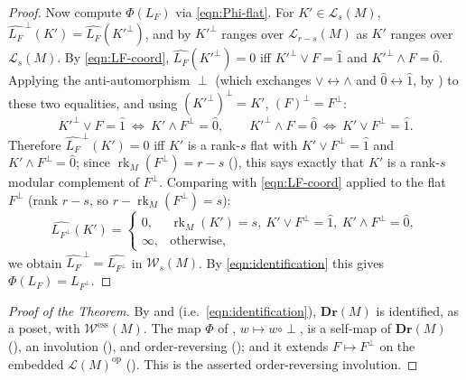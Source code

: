 \documentclass{article}
\theoremstyle{definition}
\newcommand{\rk}{\operatorname{rk}}
\newcommand{\op}{\operatorname{op}}
\newcommand{\Dr}{\mathbf{Dr}}
\newcommand{\cLL}{\mathcal{L}}
\newcommand{\cW}{\mathcal{W}}
\begin{document}
\begin{proof}
Now compute $\Phi(L_F)$ via \eqref{eqn:Phi-flat}. For $K'\in\cLL_{s}(M)$,
$\widehat{L_F}^{\,\perp}(K')=\widehat{L_F}(K'^{\perp})$, and by  $K'^{\perp}$ ranges
over $\cLL_{r-s}(M)$ as $K'$ ranges over $\cLL_{s}(M)$. By \eqref{eqn:LF-coord},
$\widehat{L_F}(K'^{\perp})=0$ iff $K'^{\perp}\vee F=\hat1$ and $K'^{\perp}\wedge F=\hat0$. Applying
the anti-automorphism $\perp$ (which exchanges $\vee\leftrightarrow\wedge$ and
$\hat0\leftrightarrow\hat1$, by ) to these two equalities, and using
$(K'^{\perp})^{\perp}=K'$, $(F)^{\perp}=F^{\perp}$:
\[
  K'^{\perp}\vee F=\hat1\ \Longleftrightarrow\ K'\wedge F^{\perp}=\hat0,\qquad
  K'^{\perp}\wedge F=\hat0\ \Longleftrightarrow\ K'\vee F^{\perp}=\hat1 .
\]
Therefore $\widehat{L_F}^{\,\perp}(K')=0$ iff $K'$ is a rank-$s$ flat with $K'\vee F^{\perp}=\hat1$
and $K'\wedge F^{\perp}=\hat0$; since $\rk_M(F^{\perp})=r-s$ (), this says exactly
that $K'$ is a rank-$s$ modular complement of $F^{\perp}$. Comparing with \eqref{eqn:LF-coord}
applied to the flat $F^{\perp}$ (rank $r-s$, so $r-\rk_M(F^{\perp})=s$):
\[
  \widehat{L_{F^{\perp}}}(K')=\begin{cases}0,&\rk_M(K')=s,\ K'\vee F^{\perp}=\hat1,\ K'\wedge
  F^{\perp}=\hat0,\\ \infty,&\text{otherwise,}\end{cases}
\]
we obtain $\widehat{L_F}^{\,\perp}=\widehat{L_{F^{\perp}}}$ in $\cW_{s}(M)$. By
\eqref{eqn:identification} this gives $\Phi(L_F)=L_{F^{\perp}}$.
\end{proof}

\begin{proof}[Proof of the Theorem]
By  and  (i.e.\ \eqref{eqn:identification}),
$\Dr(M)$ is identified, as a poset, with $\cW^{\mathrm{ess}}(M)$. The map $\Phi$ of ,
$w\mapsto w\circ\perp$, is a self-map of $\Dr(M)$ (), an involution (),
and order-reversing (); and it extends $F\mapsto F^{\perp}$ on the embedded
$\cLL(M)^{\op}$ (). This is the asserted order-reversing involution.
\end{proof}
\end{document}
